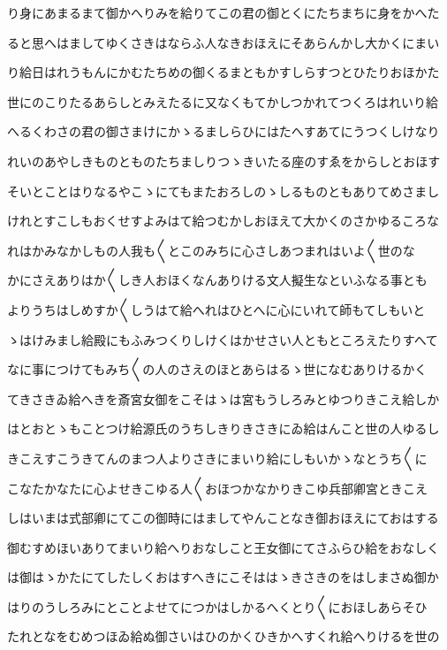 \documentclass[a4paper,11pt,landscape]{ltjtarticle}
\begin{document}
り身にあまるまて御かへりみを給りてこの君の御とくにたちまちに身をかへた
\par\medskip
ると思へはましてゆくさきはならふ人なきおほえにそあらんかし大かくにまい
\par\medskip
り給日はれうもんにかむたちめの御くるまともかすしらすつとひたりおほかた
\par\medskip
世にのこりたるあらしとみえたるに又なくもてかしつかれてつくろはれいり給
\par\medskip
へるくわさの君の御さまけにかゝるましらひにはたへすあてにうつくしけなり
\par\medskip
れいのあやしきものとものたちましりつゝきいたる座のすゑをからしとおほす
\par\medskip
そいとことはりなるやこゝにてもまたおろしのゝしるものともありてめさまし
\par\medskip
けれとすこしもおくせすよみはて給つむかしおほえて大かくのさかゆるころな
\par\medskip
れはかみなかしもの人我も〱とこのみちに心さしあつまれはいよ〱世のな
\par\medskip
かにさえありはか〱しき人おほくなんありける文人擬生なといふなる事とも
\par\medskip
よりうちはしめすか〱しうはて給へれはひとへに心にいれて師もてしもいと
\par\medskip
ゝはけみまし給殿にもふみつくりしけくはかせさい人ともところえたりすへて
\par\medskip
なに事につけてもみち〱の人のさえのほとあらはるゝ世になむありけるかく
\par\medskip
てきさきゐ給へきを斎宮女御をこそはゝは宮もうしろみとゆつりきこえ給しか
\par\medskip
はとおとゝもことつけ給源氏のうちしきりきさきにゐ給はんこと世の人ゆるし
\par\medskip
きこえすこうきてんのまつ人よりさきにまいり給にしもいかゝなとうち〱に
\par\medskip
こなたかなたに心よせきこゆる人〱おほつかなかりきこゆ兵部卿宮ときこえ
\par\medskip
しはいまは式部卿にてこの御時にはましてやんことなき御おほえにておはする
\par\medskip
御むすめほいありてまいり給へりおなしこと王女御にてさふらひ給をおなしく
\par\medskip
は御はゝかたにてしたしくおはすへきにこそははゝきさきのをはしまさぬ御か
\par\medskip
はりのうしろみにとことよせてにつかはしかるへくとり〱におほしあらそひ
\par\medskip
たれとなをむめつほゐ給ぬ御さいはひのかくひきかへすくれ給へりけるを世の
\end{document}
